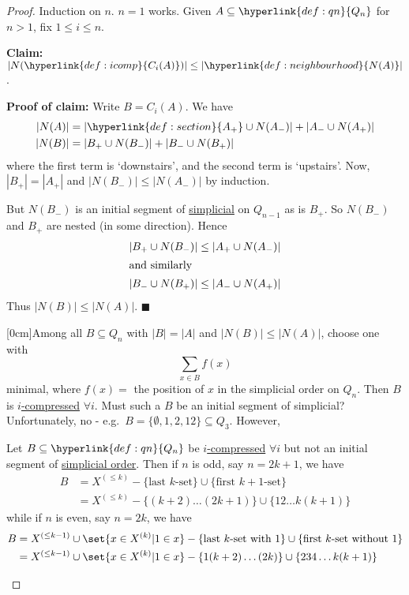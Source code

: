 \documentclass{article}
\let\subset\subseteq
\begin{document}
\begin{proof}
  Induction on $n$. $n=1$ works.
  Given $A \subset \hyperlink{def:qn}{Q_n}$ for $n > 1$, fix $1 \leq i \leq n$.

  \textbf{Claim:} $|N(\hyperlink{def:icomp}{C_i(A)})| \leq |\hyperlink{def:neighbourhood}{N(A)}|$.

  \textbf{Proof of claim:} Write $B = C_i(A)$.
  We have
  \begin{align*}
    |N(A)| &= |\hyperlink{def:section}{A_+} \cup N(A_-)| + |A_- \cup N(A_+)| \\
    |N(B)| &= |B_+ \cup N(B_-)| + |B_- \cup N(B_+)|
  \end{align*}
  where the first term is `downstairs', and the second term is `upstairs'.
  Now, $|B_+| = |A_+|$ and $|N(B_-)| \leq |N(A_-)|$ by induction.

  But $N(B_-)$ is an initial segment of \hyperlink{def:simplicial}{simplicial} on $Q_{n-1}$ as is $B_+$.
  So $N(B_-)$ and $B_+$ are nested (in some direction).
  Hence
  \begin{align*}
    |B_+ \cup N(B_-)| &\leq |A_+ \cup N(A_-)| \\
    \shortintertext{and similarly}
    |B_- \cup N(B_+)| &\leq |A_- \cup N(A_+)|
  \end{align*}
  Thus $|N(B)| \leq |N(A)|$. $\blacksquare$

  [0cm]Among all $B \subset Q_n$ with $|B| = |A|$ and $|N(B)| \leq |N(A)|$, choose one with
  \begin{equation*}
    \sum_{x \in B} f(x)
  \end{equation*}
  minimal, where $f(x)=$ the position of $x$ in the simplicial order on $Q_n$.
  Then $B$ is \hyperlink{def:icomp}{$i$-compressed} $\forall i$.
  Must such a $B$ be an initial segment of simplicial?
  Unfortunately, no - e.g.\ $B = \{\emptyset,1,2,12\} \subset Q_3$.
  However,
  \begin{nlemma}\label{lem:2.2}
    Let $B \subset \hyperlink{def:qn}{Q_n}$ be \hyperlink{def:icomp}{$i$-compressed} $\forall i$ but not an initial segment of \hyperlink{def:simplicial}{simplicial order}.
    Then if $n$ is odd, say $n = 2k+1$, we have
    \begin{align*}
      B &= X^{(\leq k)} - \{\text{last $k$-set}\} \cup {\{\text{first $k+1$-set}\}}\\
        &= X^{(\leq k)} - \{(k+2) \dotsc (2k+1)\} \cup \{12\dotsc k(k+1)\}
    \end{align*}
    while if $n$ is even, say $n = 2k$, we have
    \begin{align*}
      B &= X^{(\leq k-1)} \cup \set{x \in X^{(k)} | 1 \in x} - \{\text{last $k$-set with 1}\} \cup \{\text{first $k$-set without $1$}\}\\
        &= X^{(\leq k-1)} \cup \set{x \in X^{(k)} | 1 \in x} - \{1(k+2)\dotsc(2k)\} \cup \{234\dotsc k(k+1)\}
    \end{align*}
  \end{nlemma}


\end{proof}
\end{document}
